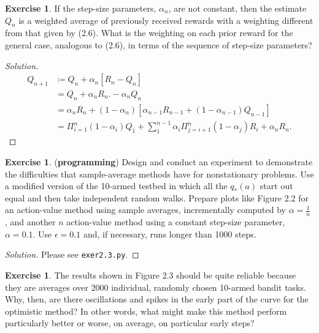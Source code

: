 \documentclass[oneside,11pt]{article}
\theoremstyle{definition}
\newtheorem{exer}[thm]{Exercise}
\newcommand{\qstar}{q_{\ast}}
\newenvironment{solution}
{\renewcommand\qedsymbol{$\blacksquare$}\begin{proof}[Solution]} {\end{proof}}
\begin{document}
\begin{exer}
If the step-size parameters, $\alpha_n$, are not constant, then the estimate $Q_n$ is a weighted average of previously received rewards with a weighting different from that given by (2.6). What is the weighting on each prior reward for the general case, analogous to (2.6), in terms of the sequence of step-size parameters?
\end{exer}


\begin{shaded}
\begin{solution} 


\begin{equation*} %
\begin{split}
Q_{n+1} & \coloneqq Q_n + \alpha_n \left [ R_n - Q_n \right ] \\
& = Q_n + \alpha_n R_n. - \alpha_n Q_n \\
& = \alpha_n R_n + (1 - \alpha_n) \left [ \alpha_{n-1} R_{n-1} + (1 - \alpha_{n-1})Q_{n-1} \right ] \\
& = \Pi_{i =1}^{n} (1- \alpha_i)Q_1 + \sum_1^{n-1} \alpha_i \Pi_{j =i+1}^n (1- \alpha_j)R_i + \alpha_n R_n.
\end{split}
\end{equation*}



\end{solution}
\end{shaded}

\begin{exer}
(\textbf{programming}) Design and conduct an experiment to demonstrate the difficulties that sample-average methods have for nonstationary problems. Use a modified version of the 10-armed testbed in which all the $\qstar(a)$ start out equal and then take independent random walks. Prepare plots like Figure 2.2 for an action-value method using sample averages, incrementally computed by $\alpha = \frac{1}{n}$ , and another $n$ action-value method using a constant step-size parameter, $\alpha = 0.1$. Use $\epsilon = 0.1$ and, if necessary, runs longer than 1000 steps.
\end{exer}

\begin{shaded}
\begin{solution} 
Please see \texttt{exer2.3.py}.
\end{solution}
\end{shaded}



\begin{exer}
The results shown in Figure 2.3 should be quite reliable because they are averages over 2000 individual, randomly chosen 10-armed bandit tasks. Why, then, are there oscillations and spikes in the early part of the curve for the optimistic method? In other words, what might make this method perform particularly better or worse, on average, on particular early steps?
\end{exer}
\end{document}
